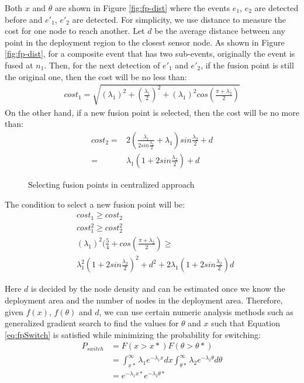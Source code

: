 Both \(x\) and \(\theta\) are shown in Figure \ref{fig:fp-dist} where the events \(e_1\), \(e_2\) are detected before and \(e'_1\), \(e'_2\) are detected. For simplicity, we use distance to measure the cost for one node to reach another. Let \(d\) be the average distance between any point in the deployment region to the closest sensor node. As shown in Figure \ref{fig:fp-dist}, for a composite event that has two sub-events, originally the event is fused at \(n_1\). Then, for the next detection of \(e'_1\) and \(e'_2\), if the fusion point is still the original one, then the cost will be no less than:
\begin{align*}
cost_1=\sqrt{({\lambda}_1)^2+(\frac{{\lambda}_1}{2})^2+({\lambda}_1)^2cos(\frac{\pi+{\lambda}_2}{2})}
\end{align*}
On the other hand, if a new fusion point is selected, then the cost will be no more than:
\begin{align*}
cost_2=&2(\frac{{\lambda}_1}{2sin\frac{{\lambda}_2}{2}}+{\lambda}_1)sin\frac{{\lambda}_2}{2}+d\\
=&{\lambda}_1(1+2sin\frac{{\lambda}_2}{2})+d
\end{align*}

\begin{figure}
\centering
{}
\caption{Selecting fusion points in centralized approach}
\label{fig:centralizedCEDU}
\end{figure}

The condition to select a new fusion point will be:
\begin{align}
&cost_1\geq cost_2\nonumber \\
&cost_1^2\geq cost_2^2\nonumber \\
&({\lambda}_1)^2(\frac{5}{4}+cos(\frac{\pi+{\lambda}_2}{2})\geq\nonumber \\ &{\lambda}_1^2(1+2sin\frac{{\lambda}_2}{2})^2+d^2+2{\lambda}_1(1+2sin\frac{{\lambda}_2}{2})d
\label{eq:fpSwitch}
\end{align}

Here \(d\) is decided by the node density and can be estimated once we know the deployment area and the number of nodes in the deployment area. Therefore, given \(f(x)\), \(f(\theta)\) and \(d\), we can use certain numeric analysis methods such as generalized gradient search to find the values for \(\theta\) and \(x\) such that Equation \ref{eq:fpSwitch} is satisfied while minimizing the probability for switching:
\begin{align*}
P_{switch}&=F(x>x*)F(\theta>\theta *)\\
&=\int_{x*}^{\infty}{\lambda}_1e^{-{\lambda}_1x}dx\int_{\theta *}^{\infty}{\lambda}_2e^{-{\lambda}_2\theta}d\theta\\
&=e^{-{\lambda}_1x*}e^{-{\lambda}_2\theta *}
\end{align*}

